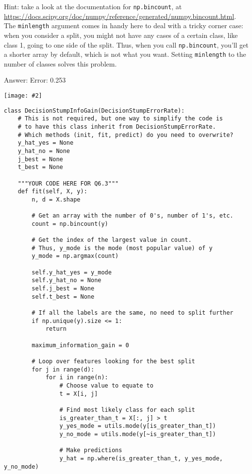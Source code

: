 \documentclass{article}
\newcommand{\gre}[1]{\textcolor{gre}{#1}}
\newcommand\ans[1]{\par\gre{Answer: #1}}
\newcommand{\centerfig}[2]{\begin{center}\texttt{[image: \#2]}\end{center}}
\begin{document}
  Hint: take a look at the documentation for \texttt{np.bincount}, at \\
  \url{https://docs.scipy.org/doc/numpy/reference/generated/numpy.bincount.html}.
  The \texttt{minlength} argument comes in handy here to deal with a tricky corner case:
  when you consider a split, you might not have any cases of a certain class, like class 1,
  going to one side of the split. Thus, when you call \texttt{np.bincount}, you'll get
  a shorter array by default, which is not what you want. Setting \texttt{minlength} to the
  number of classes solves this problem.
\ans{ 
  \newline
  Error: 0.253
  \centerfig{0.7}{./figs/DecisionStumpInfoGain_decisionBoundary}
  }
  \newpage
\begin{verbatim}
class DecisionStumpInfoGain(DecisionStumpErrorRate):
    # This is not required, but one way to simplify the code is
    # to have this class inherit from DecisionStumpErrorRate.
    # Which methods (init, fit, predict) do you need to overwrite?
    y_hat_yes = None
    y_hat_no = None
    j_best = None
    t_best = None

    """YOUR CODE HERE FOR Q6.3"""
    def fit(self, X, y):
        n, d = X.shape

        # Get an array with the number of 0's, number of 1's, etc.
        count = np.bincount(y)

        # Get the index of the largest value in count.
        # Thus, y_mode is the mode (most popular value) of y
        y_mode = np.argmax(count)

        self.y_hat_yes = y_mode
        self.y_hat_no = None
        self.j_best = None
        self.t_best = None

        # If all the labels are the same, no need to split further
        if np.unique(y).size <= 1:
            return

        maximum_information_gain = 0

        # Loop over features looking for the best split
        for j in range(d):
            for i in range(n):
                # Choose value to equate to
                t = X[i, j]

                # Find most likely class for each split
                is_greater_than_t = X[:, j] > t
                y_yes_mode = utils.mode(y[is_greater_than_t])
                y_no_mode = utils.mode(y[~is_greater_than_t])

                # Make predictions
                y_hat = np.where(is_greater_than_t, y_yes_mode, y_no_mode)


\end{verbatim}
\end{document}
